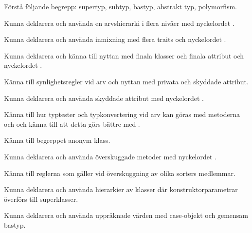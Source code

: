 

\item Förstå följande begrepp: supertyp, subtyp, bastyp, abstrakt typ, polymorfism.
\item Kunna deklarera och använda en arvshierarki i flera nivåer med nyckelordet .
\item Kunna deklarera och använda inmixning med flera traits och nyckelordet .
\item Kunna deklarera och känna till nyttan med finala klasser och finala attribut och nyckelordet .
\item Känna till synlighetsregler vid arv och nyttan med privata och skyddade attribut.
\item Kunna deklarera och använda skyddade attribut med nyckelordet .
\item Känna till hur typtester och typkonvertering vid arv kan göras med metoderna  och  och känna till att detta görs bättre med .
\item Känna till begreppet anonym klass.
\item Kunna deklarera och använda överskuggade metoder med nyckelordet .
\item Känna till reglerna som gäller vid överskuggning av olika sorters medlemmar.
\item Kunna deklarera och använda hierarkier av klasser där konstruktorparametrar överförs till superklasser.
\item Kunna deklarera och använda uppräknade värden med case-objekt och gemensam bastyp.
